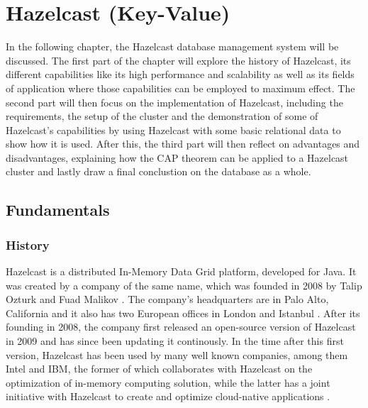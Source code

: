
\chapter{Hazelcast (Key-Value)} \label{ch:hazelcast}


In the following chapter, the Hazelcast database management system will be discussed. 
The first part of the chapter will explore the history of Hazelcast, 
its different capabilities like its high performance and scalability as well as its fields of application where those capabilities can be 
employed to maximum effect. 
The second part will then focus on the implementation of Hazelcast, including the requirements, the setup of the cluster and the demonstration of 
some of Hazelcast's capabilities by using Hazelcast with some basic relational data to show how it is used. 
After this, the third part will then reflect on advantages and disadvantages, explaining how the CAP 
theorem can be applied to a Hazelcast cluster and lastly draw a final conclustion on the database as a whole.

\section{Fundamentals} \label{sec:fundamentalsHazelcast}
\subsection{History} \label{subsec:historyHazelcast}
Hazelcast is a distributed In-Memory Data Grid platform, developed for Java. It was created by a company of the same name, 
which was founded in 2008 by Talip Ozturk and Fuad Malikov \parencite{DatabaseofDatabases.11032023}. The company's headquarters are 
in Palo Alto, California and it also has two European offices in London and Istanbul \parencite{HazelcastContact.03112022}. \newline
After its founding in 2008, the company first released an open-source version of Hazelcast in 2009 and has since been updating it 
continously\parencite{DatabaseofDatabases.11032023}. In the time after this first version, Hazelcast has been used by many well known companies, 
among them Intel and IBM, the former of which collaborates with Hazelcast on the optimization of in-memory computing solution, while 
the latter has a joint initiative with Hazelcast to create and optimize cloud-native applications \parencite{HazelcastPartners.270122}.
